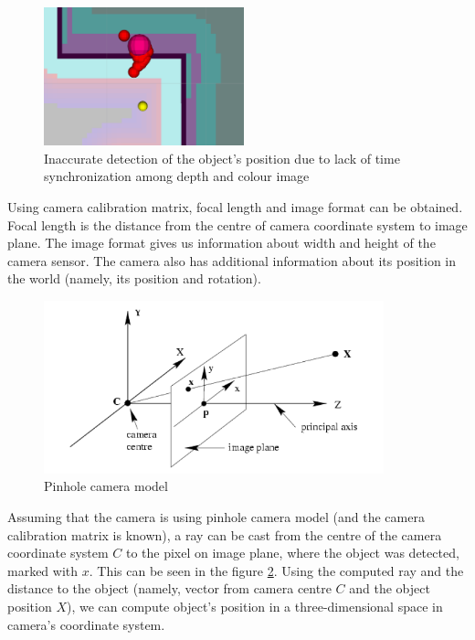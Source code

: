 \documentclass[12pt,a4paper]{article}
\begin{document}
	\begin{figure}[h]
		\centering
		\includegraphics[height=4cm]{images/detections}
		\caption{Inaccurate detection of the object's position due to lack of time synchronization among depth and colour image}
		\label{fig:non_synchronized_raw_detection}
	\end{figure}

	Using camera calibration matrix, focal length and image format can be obtained. Focal length is the distance from the centre of camera coordinate system to image plane. The image format gives us information about width and height of the camera sensor. The camera also has additional information about its position in the world (namely, its position and rotation). \\

	\begin{figure}[h]
		\centering
		\includegraphics[height=5cm]{images/pinhole_camera_model.png}
		\caption{Pinhole camera model}
		\label{fig:pinhole_camera_model}
	\end{figure}
	
	Assuming that the camera is using pinhole camera model (and the camera calibration matrix is known), a ray can be cast from the centre of the camera coordinate system $C$ to the pixel on image plane, where the object was detected, marked with $x$. This can be seen in the figure \ref{fig:pinhole_camera_model}. Using the computed ray and the distance to the object (namely, vector from camera centre $C$ and the object position $X$), we can compute object's position in a three-dimensional space in camera's coordinate system. \\
	
\end{document}
